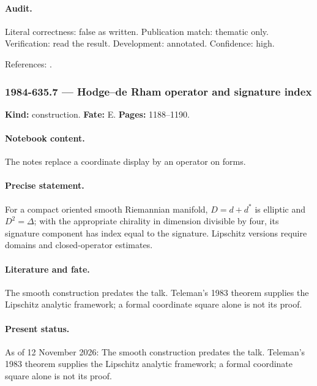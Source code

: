 \paragraph{Audit.} Literal correctness: false as written. Publication match: thematic only. Verification: read the result. Development: annotated. Confidence: high.

\noindent References: \citep{teleman1983signature}.\par

\subsubsection{1984-635.7 --- Hodge--de Rham operator and signature index}

\label{item:1984-635.7}

\noindent\textbf{Kind:} construction. \textbf{Fate:} E. \textbf{Pages:} 1188--1190.\par

\paragraph{Notebook content.} The notes replace a coordinate display by an operator on forms.

\paragraph{Precise statement.} For a compact oriented smooth Riemannian manifold, \(D=d+d^*\) is elliptic and \(D^2=\Delta\); with the appropriate chirality in dimension divisible by four, its signature component has index equal to the signature. Lipschitz versions require domains and closed-operator estimates.

\paragraph{Literature and fate.} The smooth construction predates the talk. Teleman's 1983 theorem supplies the Lipschitz analytic framework; a formal coordinate square alone is not its proof.

\paragraph{Present status.} As of 12 November 2026: The smooth construction predates the talk. Teleman's 1983 theorem supplies the Lipschitz analytic framework; a formal coordinate square alone is not its proof.

